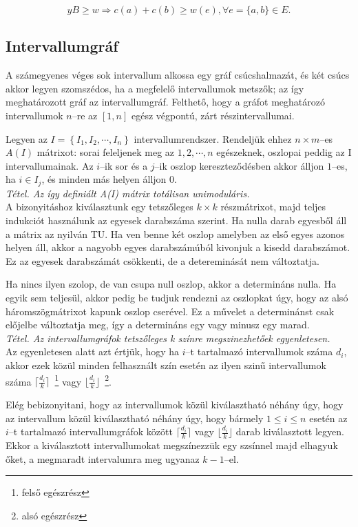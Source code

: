 \[ yB \geq w \Rightarrow c(a) + c(b) \geq w(e), \forall e=\{a,b\}\in E.\]

\subsection{Intervallumgráf}

A számegyenes véges sok intervallum alkossa egy gráf csúcshalmazát, és két csúcs
akkor legyen szomszédos, ha a megfelelő intervallumok metszők; az így
meghatározott gráf az intervallumgráf. Felthető, hogy a gráfot meghatározó
intervallumok $n$--re az $[1,n]$ egész végpontú, zárt részintervallumai.

Legyen az $I=\left\{I_1, I_2, \cdots, I_n\right\}$ intervallumrendszer.
Rendeljük ehhez $n \times m$--es $A(I)$ mátrixot: sorai feleljenek meg az
$1,2,\cdots,n$ egészeknek, oszlopai peddig az I intervallumainak. Az $i$--ik sor
és a $j$--ik oszlop kereszteződésben akkor álljon $1$--es, ha $i \in I_j$, és
minden más helyen álljon $0$. \\

\emph{Tétel. Az így definiált A(I) mátrix totálisan unimoduláris.} \\

A bizonyitáshoz kiválasztunk egy tetszőleges $k \times k$ részmátrixot, majd
teljes indukciót használunk az egyesek darabszáma szerint. Ha nulla darab
egyesből áll a mátrix az nyilván TU. Ha ven benne két oszlop amelyben az első
egyes azonos helyen áll, akkor a nagyobb egyes darabszámúból kivonjuk a kisedd
darabszámot. Ez az egyesek darabszámát csökkenti, de a detereminását nem
változtatja.

Ha nincs ilyen szolop, de van csupa null oszlop, akkor a determináns nulla. Ha
egyik sem teljesül, akkor pedig be tudjuk rendezni az oszlopkat úgy, hogy az
alsó háromszögmátrixot kapunk oszlop cserével. Ez a művelet a determinánst csak
előjelbe változtatja meg, így a determináns egy vagy minusz egy marad. \\

\emph{Tétel. Az intervallumgráfok tetszőleges k színre megszinezhetőek
egyenletesen.}\\ 

Az egyenletesen alatt azt értjük, hogy ha $i$--t tartalmazó intervallumok száma
$d_i$, akkor ezek közül minden felhasznált szín esetén az ilyen szinű
intervallumok száma $\lceil \frac{d_i}{k} \rceil$~\footnote{felső egészrész}
vagy $\lfloor \frac{d_i}{k} \rfloor$~\footnote{alsó egészrész}.

Elég bebizonyitani, hogy az intervallumok közül kiválasztható néhány úgy, hogy
az intervallum közül kiválasztható néhány úgy, hogy bármely $1 \leq i \leq n$
esetén az $i$--t tartalmazó intervallumgráfok között $\lceil \frac{d_i}{k}
\rceil$ vagy $\lfloor \frac{d_i}{k} \rfloor$ darab kiválasztott legyen. Ekkor a
kiválasztott intervallumokat megszínezzük egy szsínnel majd elhagyuk őket, a
megmaradt intervalumra meg ugyanaz $k-1$--el.

